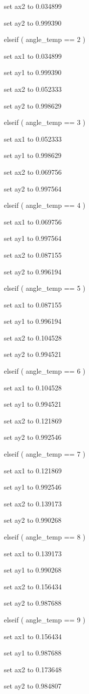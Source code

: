 \documentclass[
]{article}
\begin{document}
set ax2 to 0.034899

set ay2 to 0.999390

elseif ( angle\_temp == 2 )

set ax1 to 0.034899

set ay1 to 0.999390

set ax2 to 0.052333

set ay2 to 0.998629

elseif ( angle\_temp == 3 )

set ax1 to 0.052333

set ay1 to 0.998629

set ax2 to 0.069756

set ay2 to 0.997564

elseif ( angle\_temp == 4 )

set ax1 to 0.069756

set ay1 to 0.997564

set ax2 to 0.087155

set ay2 to 0.996194

elseif ( angle\_temp == 5 )

set ax1 to 0.087155

set ay1 to 0.996194

set ax2 to 0.104528

set ay2 to 0.994521

elseif ( angle\_temp == 6 )

set ax1 to 0.104528

set ay1 to 0.994521

set ax2 to 0.121869

set ay2 to 0.992546

elseif ( angle\_temp == 7 )

set ax1 to 0.121869

set ay1 to 0.992546

set ax2 to 0.139173

set ay2 to 0.990268

elseif ( angle\_temp == 8 )

set ax1 to 0.139173

set ay1 to 0.990268

set ax2 to 0.156434

set ay2 to 0.987688

elseif ( angle\_temp == 9 )

set ax1 to 0.156434

set ay1 to 0.987688

set ax2 to 0.173648

set ay2 to 0.984807
\end{document}
